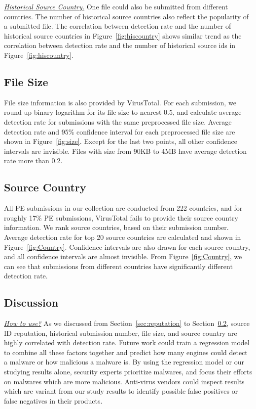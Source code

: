 {\textit{\underline{Historical Source Country.}}}
One file could also be submitted from different countries. 
The number of historical source countries also reflect the popularity of a submitted file. 
The correlation between detection rate and the number of historical source countries in 
Figure~\ref{fig:hiscountry} shows similar trend as the correlation between detection rate and the number of historical source ids in Figure~\ref{fig:hiscountry}. 

\subsection{File Size}
\label{sec:size}


File size information is also provided by VirusTotal. 
For each submission, we round up binary logarithm for its file size to nearest 0.5,
and calculate average detection rate for submissions with the same preprocessed file size.
Average detection rate and 95\% confidence interval for each preprocessed file size are shown in Figure~\ref{fig:size}.
Except for the last two points, all other confidence intervals are invisible.   
Files with size from 90KB to 4MB have average detection rate more than 0.2. 

\subsection{Source Country}
\label{sec:country}


All PE submissions in our collection are conducted from 222 countries, 
and for roughly 17\% PE submissions, 
VirusTotal fails to provide their source country information. 
We rank source countries, based on their submission number. 
Average detection rate for top 20 source countries are calculated and shown in 
Figure~\ref{fig:Country}. 
Confidence intervals are also drawn for each source country, 
and all confidence intervals are almost invisible. 
From Figure~\ref{fig:Country}, 
we can see that submissions from different countries have significantly different detection rate.   

\subsection{Discussion}

{\textit{\underline{How to use?}}}
As we discussed from Section~\ref{sec:reputation} to Section~\ref{sec:country}, 
source ID reputation, historical submission number, file size, 
and source country are highly correlated with detection rate. 
Future work could train a regression model to combine all these factors together and 
predict how many engines could detect a malware or how malicious a malware is. 
By using the regression model or our studying results alone, 
security experts prioritize malwares, and focus their efforts on malwares which are more malicious. 
Anti-virus vendors could inspect results which are variant from our study results 
to identify possible false positives or false negatives in their products. 

